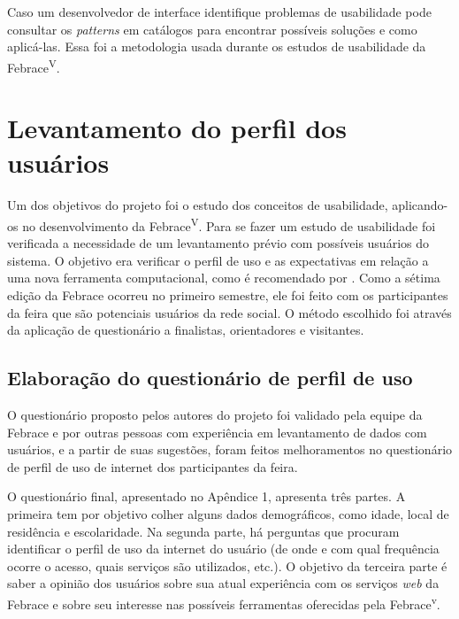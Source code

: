 Caso um desenvolvedor de interface identifique problemas de usabilidade pode consultar os \textit{patterns} em catálogos para encontrar possíveis soluções e como aplicá-las. Essa foi a metodologia usada durante os estudos de usabilidade da Febrace\textsuperscript{V}.

\section{Levantamento do perfil dos usuários}

  Um dos objetivos do projeto foi o estudo dos conceitos de usabilidade, aplicando-os no desenvolvimento da Febrace\textsuperscript{V}. Para se fazer um estudo de usabilidade foi verificada a necessidade de um levantamento prévio com possíveis usuários do sistema. O objetivo era verificar o perfil de uso e as expectativas em relação a uma nova ferramenta computacional, como é recomendado por . Como a sétima edição da Febrace ocorreu no primeiro semestre, ele foi feito com os participantes da feira que são potenciais usuários da rede social. O método escolhido foi através da aplicação de questionário a finalistas, orientadores e visitantes.

  \subsection{Elaboração do questionário de perfil de uso}

    O questionário proposto pelos autores do projeto foi validado pela equipe da Febrace e por outras pessoas com experiência em levantamento de dados com usuários, e a partir de suas sugestões, foram feitos melhoramentos no questionário de perfil de uso de internet dos participantes da feira.

    O questionário final, apresentado no Apêndice 1, apresenta três partes. A primeira tem por objetivo colher alguns dados demográficos, como idade, local de residência e escolaridade. Na segunda parte, há perguntas que procuram identificar o perfil de uso da internet do usuário (de onde e com qual frequência ocorre o acesso, quais serviços são utilizados, etc.). O objetivo da terceira parte é saber a opinião dos usuários sobre sua atual experiência com os serviços \textit{web} da Febrace e sobre seu interesse nas possíveis ferramentas oferecidas pela Febrace\textsuperscript{v}.
